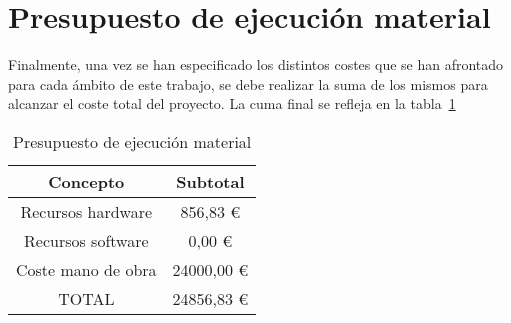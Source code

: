 \section{Presupuesto de ejecución material}\label{sec:presupuesto-material}

Finalmente, una vez se han especificado los distintos costes que se han afrontado para cada ámbito de este trabajo, se debe realizar la suma de los mismos para alcanzar el coste total del proyecto.
La cuma final se refleja en la tabla~\ref{tab:ejec_material}

\begin{table}[H]
\centering
\begin{tabular}{|c|c|}
\hline
Concepto           & Subtotal \\ \hline
Recursos hardware  & 856,83   \euro        \\ \hline
Recursos software  & 0,00     \euro        \\ \hline
Coste mano de obra & 24000,00 \euro        \\ \hline
TOTAL              & 24856,83 \euro        \\ \hline
\end{tabular}
\caption{Presupuesto de ejecución material}
\label{tab:ejec_material}
\end{table}

